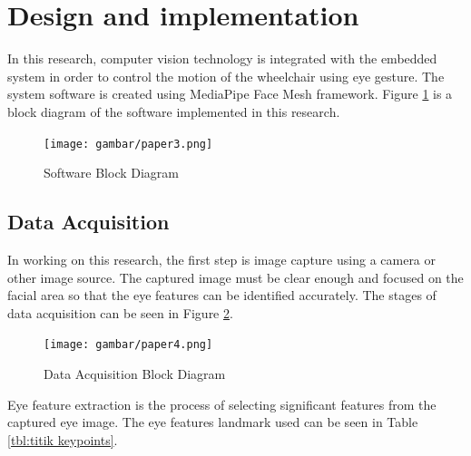 \section{Design and implementation}
\label{sec:designandimplementation}

In this research, computer vision technology is integrated with the embedded system in order to control the motion of the wheelchair using eye gesture. The system software is created using MediaPipe Face Mesh framework. Figure \ref{fig:sistem} is a block diagram of the software implemented in this research.

\begin{figure} [ht] \centering
  \texttt{[image: gambar/paper3.png]}
  \caption{Software Block Diagram}
  \label{fig:sistem}
\end{figure}

\subsection{Data Acquisition}

In working on this research, the first step is image capture using a camera or other image source. The captured image must be clear enough and focused on the facial area so that the eye features can be identified accurately. The stages of data acquisition can be seen in Figure \ref{fig:akuisisi}.

\begin{figure} [H] \centering
  \texttt{[image: gambar/paper4.png]}
  \caption{Data Acquisition Block Diagram}
  \label{fig:akuisisi}
\end{figure}

Eye feature extraction is the process of selecting significant features from the captured eye image. The eye features landmark used can be seen in Table \ref{tbl:titik keypoints}.

